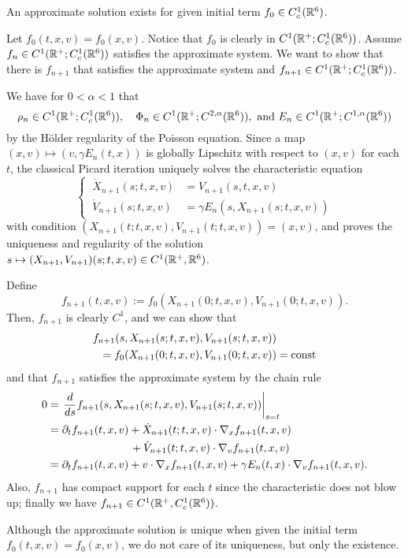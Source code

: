 \documentclass[12pt]{article}
\begin{document}
\begin{prop}
An approximate solution exists for given initial term $f_0\in C_c^1(\mathbb{R}^6)$.
\end{prop}
\begin{pf}
Let $f_0(t,x,v)=f_0(x,v)$.
Notice that $f_0$ is clearly in $C^1(\mathbb{R}^+;C_c^1(\mathbb{R}^6))$.
Assume $f_n\in C^1(\mathbb{R}^+;C_c^1(\mathbb{R}^6))$ satisfies the approximate system.
We want to show that there is $f_{n+1}$ that satisfies the approximate system and $f_{n+1}\in C^1(\mathbb{R}^+;C_c^1(\mathbb{R}^6))$.

We have for $0<\alpha<1$ that
\[\rho_n\in C^1(\R^+;C_c^1(\R^6)),\quad\Phi_n\in C^1(\R^+;C^{2,\alpha}(\R^6)),\ \text{and}\ E_n\in C^1(\R^+;C^{1,\alpha}(\R^6))\]
by the H\"older regularity of the Poisson equation.
Since a map $(x,v)\mapsto(v,\gamma E_n(t,x))$ is globally Lipschitz with respect to $(x,v)$ for each $t$, the classical Picard iteration uniquely solves the characteristic equation
\[\left\{\ \begin{alignedat}{2}
\dot X_{n+1}(s;t,x,v)&=V_{n+1}(s,t,x,v)\\
\dot V_{n+1}(s;t,x,v)&=\gamma E_n(s,X_{n+1}(s;t,x,v))
\end{alignedat}\right.\]
with condition $(X_{n+1}(t;t,x,v),V_{n+1}(t;t,x,v))=(x,v)$, and proves the uniqueness and regularity of the solution $s\mapsto(X_{n+1},V_{n+1})(s;t,x,v)\in C^1(\mathbb{R}^+,\mathbb{R}^6)$.

Define
\[f_{n+1}(t,x,v):=f_0(X_{n+1}(0;t,x,v),V_{n+1}(0;t,x,v)).\]
Then, $f_{n+1}$ is clearly $C^1$, and we can show that
\begin{align*}
f_{n+1}(s,X_{n+1}(s;t,x,v),V_{n+1}(s;t,x,v))&\\
=f_0(X_{n+1}(0;t,x,v),V_{n+1}(0;t,x,v))&=\operatorname{const}
\end{align*}
and that $f_{n+1}$ satisfies the approximate system by the chain rule
\begin{align*}
0&=\left.\dd{s}f_{n+1}(s,X_{n+1}(s;t,x,v),V_{n+1}(s;t,x,v))\right|_{s=t}\\
&=\pd_tf_{n+1}(t,x,v)+\dot X_{n+1}(t;t,x,v)\cdot\nabla_xf_{n+1}(t,x,v)\\
&\hspace{7.5em}+\dot V_{n+1}(t;t,x,v)\cdot\nabla_vf_{n+1}(t,x,v)\\
&=\pd_tf_{n+1}(t,x,v)+v\cdot\nabla_xf_{n+1}(t,x,v)+\gamma E_n(t,x)\cdot\nabla_vf_{n+1}(t,x,v).
\end{align*}
Also, $f_{n+1}$ has compact support for each $t$ since the characteristic does not blow up; finally we have $f_{n+1}\in C^1(\mathbb{R}^+,C_c^1(\mathbb{R}^6))$.
\end{pf}
\begin{rmk}
Although the approximate solution is unique when given the initial term $f_0(t,x,v)=f_0(x,v)$, we do not care of its uniqueness, but only the existence.
\end{rmk}
\end{document}
